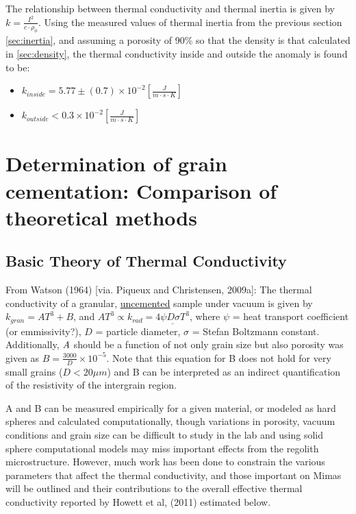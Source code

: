 \documentclass[11pt]{article} %
\begin{document}
	The relationship between thermal conductivity and thermal inertia is given by $k = \frac{I^{2}}{c \cdot \rho_{\phi}}$. Using the measured values of thermal inertia from the previous section \ref{sec:inertia}, and assuming a porosity of 90\% so that the density is that calculated in \ref{sec:density}, the thermal conductivity inside and outside the anomaly is found to be:
	
	\begin{itemize}
	\item $k_{inside} = 5.77 \pm(0.7) \times 10^{-2} [\frac{J}{m \cdot s \cdot K}]$
	\item $k_{outside} < 0.3 \times 10^{-2} [\frac{J}{m \cdot s \cdot K}]$
	\end{itemize}
	
\section{Determination of grain cementation: Comparison of theoretical methods}

\subsection{Basic Theory of Thermal Conductivity}
	From Watson (1964) [via. Piqueux and Christensen, 2009a]: The thermal conductivity of a granular, \underline{uncemented} sample under vacuum is given by $k_{gran} = A T^{3} + B$, and $A T^{3} \varpropto k_{rad} = \underline{4 \psi D \sigma T^{3}}$, where $\psi$ = heat transport coefficient (or emmissivity?), $D$ = particle diameter, $\sigma$ = Stefan Boltzmann constant. Additionally, $\emph{A}$ should be a function of not only grain size but also porosity was given as $B = \frac{3000}{D}\times10^{-5}$. Note that this equation for B does not hold for very small grains ($D<20 \mu m$) and B can be interpreted as an indirect quantification of the resistivity of the intergrain region. 

	A and B can be measured empirically for a given material, or modeled as hard spheres and calculated computationally, though variations in porosity, vacuum conditions and grain size can be difficult to study in the lab and using solid sphere computational models may miss important effects from the regolith microstructure. However, much work has been done to constrain the various parameters that affect the thermal conductivity, and those important on Mimas will be outlined and their contributions to the overall effective thermal conductivity reported by Howett et al, (2011) estimated below. 
\end{document}
